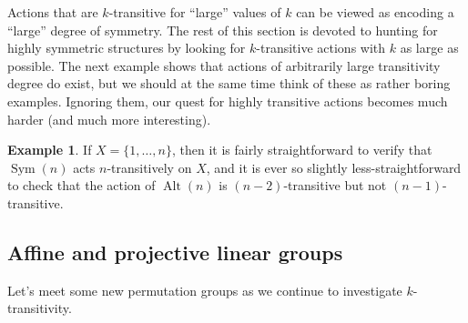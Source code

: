 \documentclass[11pt]{amsart}
\theoremstyle{plain}
\theoremstyle{definition}
\newtheorem{example}{Example}
\theoremstyle{remark}
\DeclareMathOperator{\Sym}{Sym}
\DeclareMathOperator{\Alt}{Alt}
\begin{document}
Actions that are $k$-transitive for ``large'' values of $k$ can be viewed as encoding a ``large'' degree of symmetry. The rest of this section is devoted to hunting for highly symmetric structures by looking for $k$-transitive actions with $k$ as large as possible. The next example shows that actions of arbitrarily large transitivity degree do exist, but we should at the same time think of these as rather boring examples. Ignoring them, our quest for highly transitive actions becomes much harder (and much more interesting).

\begin{example}\label{exam.SymAltKTrans}
If $X = \{1,\ldots,n\}$, then it is fairly straightforward to verify that $\Sym(n)$ acts $n$-transitively on $X$, and it is ever so slightly less-straightforward to check that the action of $\Alt(n)$ is $(n-2)$-transitive but not $(n-1)$-transitive. 
\end{example}

\subsection{Affine and projective linear groups}

Let's meet some new permutation groups as we continue to investigate $k$-transitivity. 
\end{document}
